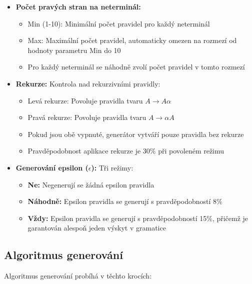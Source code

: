 \begin{itemize}
    \item \textbf{Počet pravých stran na neterminál:} 
    \begin{itemize}
        \item Min (1-10): Minimální počet pravidel pro každý neterminál
        \item Max: Maximální počet pravidel, automaticky omezen na rozmezí od hodnoty parametru Min do 10
        \item Pro každý neterminál se náhodně zvolí počet pravidel v tomto rozmezí
    \end{itemize}
    
    \item \textbf{Rekurze:} Kontrola nad rekurzivními pravidly:
    \begin{itemize}
        \item Levá rekurze: Povoluje pravidla tvaru \( A \to A \alpha \)
        \item Pravá rekurze: Povoluje pravidla tvaru \( A \to \alpha A \)
        \item Pokud jsou obě vypnuté, generátor vytváří pouze pravidla bez rekurze
        \item Pravděpodobnost aplikace rekurze je 30\% při povoleném režimu
    \end{itemize}
    
    \item \textbf{Generování epsilon (\( \epsilon \)):} Tři režimy:
    \begin{itemize}
        \item \textbf{Ne:} Negenerují se žádná epsilon pravidla
        \item \textbf{Náhodně:} Epsilon pravidla se generují s pravděpodobností 8\%
        \item \textbf{Vždy:} Epsilon pravidla se generují s pravděpodobností 15\%, přičemž je garantován alespoň jeden výskyt v gramatice
    \end{itemize}
\end{itemize}

\subsection{Algoritmus generování}
\label{sec:GrammarsGenerationAlgorithm}

Algoritmus generování probíhá v těchto krocích:

